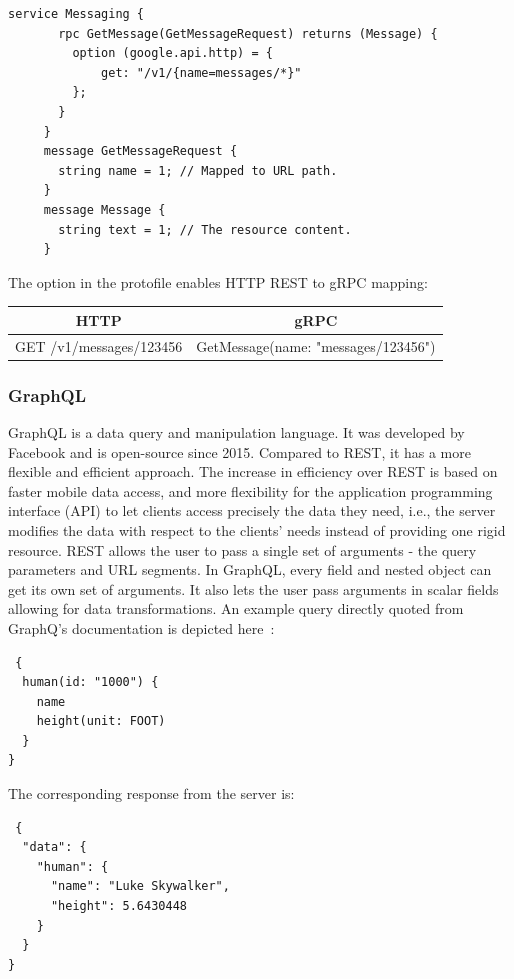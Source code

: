 \begin{lstlisting}[language=protobuf3,style=protobuf]
     service Messaging {
       rpc GetMessage(GetMessageRequest) returns (Message) {
         option (google.api.http) = {
             get: "/v1/{name=messages/*}"
         };
       }
     }
     message GetMessageRequest {
       string name = 1; // Mapped to URL path.
     }
     message Message {
       string text = 1; // The resource content.
     }
\end{lstlisting}

The option in the protofile enables HTTP REST to gRPC mapping:

    \begin{tabular}{c|c}
        \textbf{HTTP} & \textbf{gRPC} \\ \hline
        GET /v1/messages/123456 & GetMessage(name: "messages/123456")
    \end{tabular}

\subsubsection{GraphQL}
GraphQL is a data query and manipulation language. It was developed by Facebook and is open-source since 2015. Compared to REST, it has a more flexible and efficient approach. The increase in efficiency over REST is based on faster mobile data access, and more flexibility for the application programming interface (API) to let clients access precisely the data they need, i.e., the server modifies the data with respect to the clients' needs instead of providing one rigid resource. REST allows the user to pass a single set of arguments - the query parameters and URL segments. In GraphQL, every field and nested object can get its own set of arguments. It also lets the user pass arguments in scalar fields allowing for data transformations. An example query directly quoted from GraphQ's documentation is depicted here~\cite{GraphQL-Documentation2018Basics2018}:

\begin{lstlisting}
 {
  human(id: "1000") {
    name
    height(unit: FOOT)
  }
}
\end{lstlisting}

The corresponding response from the server is:

\begin{minipage}{\linewidth}
\begin{lstlisting}
 {
  "data": {
    "human": {
      "name": "Luke Skywalker",
      "height": 5.6430448
    }
  }
}
\end{lstlisting}
\end{minipage}

